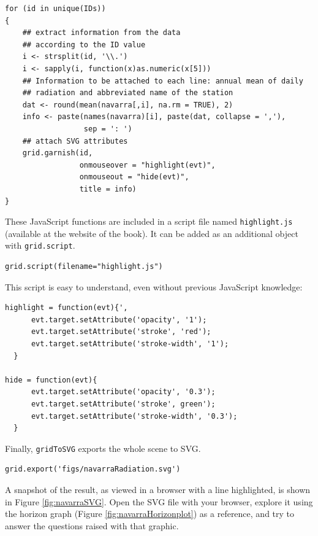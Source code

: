 \lstset{language=r,label= ,caption= ,captionpos=b,numbers=none}
\begin{lstlisting}
for (id in unique(IDs))
{
    ## extract information from the data
    ## according to the ID value
    i <- strsplit(id, '\\.')
    i <- sapply(i, function(x)as.numeric(x[5]))
    ## Information to be attached to each line: annual mean of daily
    ## radiation and abbreviated name of the station
    dat <- round(mean(navarra[,i], na.rm = TRUE), 2)
    info <- paste(names(navarra)[i], paste(dat, collapse = ','),
                  sep = ': ')
    ## attach SVG attributes
    grid.garnish(id,
                 onmouseover = "highlight(evt)",
                 onmouseout = "hide(evt)",
                 title = info)
}
\end{lstlisting}

These JavaScript functions are included in a script file named
\texttt{highlight.js} (available at the website of the book). It can be
added as an additional object with \texttt{grid.script}.


\lstset{language=r,label= ,caption= ,captionpos=b,numbers=none}
\begin{lstlisting}
grid.script(filename="highlight.js")
\end{lstlisting}

This script is easy to understand, even without previous
JavaScript knowledge:
\begin{verbatim}
highlight = function(evt){',
      evt.target.setAttribute('opacity', '1');
      evt.target.setAttribute('stroke', 'red');
      evt.target.setAttribute('stroke-width', '1');
  }
  
hide = function(evt){
      evt.target.setAttribute('opacity', '0.3');
      evt.target.setAttribute('stroke', green');
      evt.target.setAttribute('stroke-width', '0.3');
  }
\end{verbatim}

Finally, \texttt{gridToSVG} exports the whole scene to SVG. 


\lstset{language=r,label= ,caption= ,captionpos=b,numbers=none}
\begin{lstlisting}
grid.export('figs/navarraRadiation.svg')
\end{lstlisting}

A snapshot of the result, as viewed in a browser with a line
highlighted, is shown in Figure \ref{fig:navarraSVG}. Open the SVG
file with your browser, explore it using the horizon graph (Figure
\ref{fig:navarraHorizonplot}) as a reference, and try to answer the
questions raised with that graphic.

